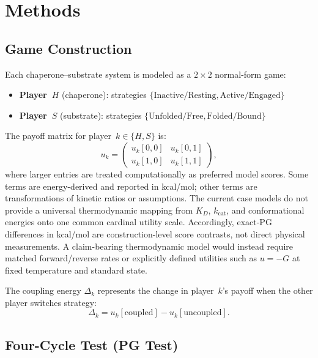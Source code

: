 \documentclass[12pt,a4paper]{article}
\begin{document}
\section{Methods}
\label{sec:methods}

\subsection{Game Construction}
\label{sec:game_construction}

Each chaperone--substrate system is modeled as a $2\times 2$ normal-form
game:
\begin{itemize}
  \item \textbf{Player~$H$} (chaperone): strategies
    $\{\text{Inactive/Resting}, \text{Active/Engaged}\}$
  \item \textbf{Player~$S$} (substrate): strategies
    $\{\text{Unfolded/Free}, \text{Folded/Bound}\}$
\end{itemize}

The payoff matrix for player~$k \in \{H, S\}$ is:
\begin{equation}
  u_k = \begin{pmatrix}
    u_k[0,0] & u_k[0,1] \\
    u_k[1,0] & u_k[1,1]
  \end{pmatrix},
\end{equation}
where larger entries are treated computationally as preferred model
scores. Some terms are energy-derived and reported in kcal/mol; other
terms are transformations of kinetic ratios or assumptions. The current
case models do not provide a universal thermodynamic mapping from
$K_D$, $k_\text{cat}$, and conformational energies onto one common
cardinal utility scale. Accordingly, exact-PG differences in kcal/mol
are construction-level score contrasts, not direct physical
measurements. A claim-bearing thermodynamic model would instead require
matched forward/reverse rates or explicitly defined utilities such as
$u=-G$ at fixed temperature and standard state.

The coupling energy $\Delta_k$ represents the change in player~$k$'s
payoff when the other player switches strategy:
\begin{equation}
  \Delta_k = u_k[\text{coupled}] - u_k[\text{uncoupled}].
\end{equation}

\subsection{Four-Cycle Test (PG Test)}
\end{document}
